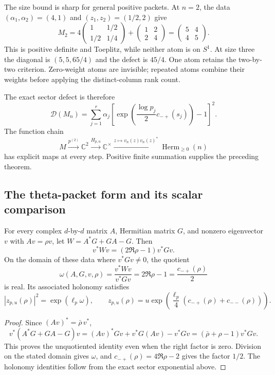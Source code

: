 The size bound is sharp for general positive packets. At $n=2$, the data $(\alpha_1,\alpha_2)=(4,1)$ and $(z_1,z_2)=(1/2,2)$ give
\[
M_2=4\begin{pmatrix}1&1/2\\1/2&1/4\end{pmatrix}
+\begin{pmatrix}1&2\\2&4\end{pmatrix}
=\begin{pmatrix}5&4\\4&5\end{pmatrix}.
\]
This is positive definite and Toeplitz, while neither atom is on $S^1$. At size three the diagonal is $(5,5,65/4)$ and the defect is $45/4$. One atom retains the two-by-two criterion. Zero-weight atoms are invisible; repeated atoms combine their weights before applying the distinct-column rank count.

The exact sector defect is therefore
\[
\mathcal D(M_n)=\sum_{j=1}^r\alpha_j
\left[\exp\!\left(\frac{\log p_j}{2}c_{-+}(s_j)\right)-1\right]^2 .
\]
The function chain
\[
M\xrightarrow{p^{(2)}}\mathbb C^2
\xrightarrow{H_{p,u}}\mathbb C^\times
\xrightarrow{z\mapsto v_n(z)v_n(z)^*}\operatorname{Herm}_{\ge0}(n)
\]
has explicit maps at every step. Positive finite summation supplies the preceding theorem.

\subsection{The theta-packet form and its scalar comparison}

\begin{proposition}
\label{prop:sz-theta-form-quotient}
For every complex $d$-by-$d$ matrix $A$, Hermitian matrix $G$, and nonzero eigenvector $v$ with $Av=\rho v$, let $W=A^*G+GA-G$. Then
\[
v^*Wv=(2\Re\rho-1)v^*Gv.
\]
On the domain of these data where $v^*Gv\ne0$, the quotient
\[
\omega(A,G,v,\rho)=\frac{v^*Wv}{v^*Gv}
=2\Re\rho-1=\frac{c_{-+}(\rho)}2
\]
is real. Its associated holonomy satisfies
\[
|z_{p,u}(\rho)|^2=\exp(\ell_p\omega),\qquad
z_{p,u}(\rho)=u\exp\!\left(\frac{\ell_p}{4}
(c_{-+}(\rho)+c_{--}(\rho))\right).
\]
\end{proposition}
\begin{proof}
Since $(Av)^*=\bar\rho\,v^*$,
\[
v^*(A^*G+GA-G)v
=(Av)^*Gv+v^*G(Av)-v^*Gv
=(\bar\rho+\rho-1)v^*Gv .
\]
This proves the unquotiented identity even when the right factor is zero. Division on the stated domain gives $\omega$, and $c_{-+}(\rho)=4\Re\rho-2$ gives the factor $1/2$. The holonomy identities follow from the exact sector exponential above.
\end{proof}

